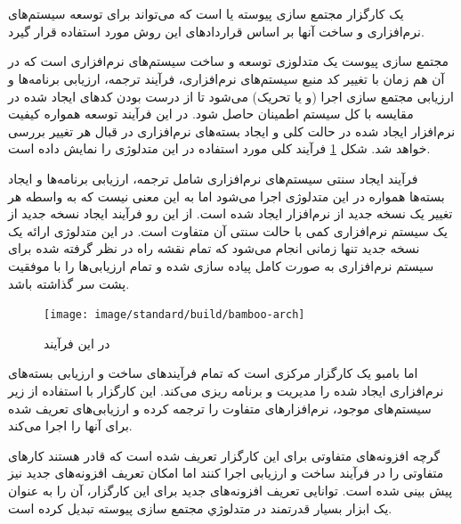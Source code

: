 
\section{}

 یک کارگزار مجتمع سازی پیوسته یا
 است که می‌تواند برای توسعه سیستم‌های نرم‌افزاری و ساخت آنها بر اساس
قراردادهای این روش مورد استفاده قرار گیرد.

مجتمع سازی پیوست یک متدلوزی توسعه و ساخت سیستم‌های نرم‌افزاری است که در آن 
هم زمان با تغییر کد منبع سیستم‌های نرم‌افزاری، فرآیند ترجمه، ارزیابی
برنامه‌ها و ارزیابی مجتمع سازی اجرا (و یا تحریک) می‌شود تا از درست بودن کدهای
ایجاد شده در مقایسه با کل سیستم اطمینان حاصل شود. در این فرآیند توسعه همواره
کیفیت نرم‌افزار ایجاد شده در حالت کلی و ایجاد بسته‌های نرم‌افزاری در قبال هر
تغییر بررسی خواهد شد. شکل \ref{image/standard/build/bamboo-arch} فرآیند کلی مورد
استفاده در این متدلوژی را نمایش داده است.

فرآیند ایجاد سنتی سیستم‌های نرم‌افزاری شامل ترجمه، ارزیابی برنامه‌ها و ایجاد
بسته‌ها همواره در این متدلوژی اجرا می‌شود اما به این معنی نیست که به واسطه هر
تغییر یک نسخه جدید از نرم‌افزار ایجاد شده است. از این رو فرآیند ایجاد نسخه جدید
از یک سیستم نرم‌افزاری کمی با حالت سنتی آن متفاوت است. در این متدلوژی ارائه یک
نسخه جدید تنها زمانی انجام می‌شود که تمام نقشه راه در نظر گرفته شده برای سیستم
نرم‌افزاری به صورت کامل پیاده سازی شده و تمام ارزیابی‌ها را با موفقیت پشت
سر گذاشته باشد.

\begin{figure}
\centering
\texttt{[image: image/standard/build/bamboo-arch]}
\caption[فرآیند مجتمع سازی پیوسته یا ]{
	در این فرآيند
}
\label{image/standard/build/bamboo-arch}
\end{figure}



اما بامبو یک کارگزار مرکزی است که تمام فرآیندهای ساخت و ارزیابی بسته‌های
نرم‌افزاری ایجاد شده را مدیریت و برنامه ریزی می‌کند. این کارگزار با استفاده از
زیر سیستم‌های موجود، نرم‌افزارهای متفاوت را ترجمه کرده و ارزیابی‌های تعریف شده
برای آنها را اجرا می‌کند.

گرچه افزونه‌های متفاوتی برای این کارگزار تعریف شده است که قادر هستند کارهای
متفاوتی را در فرآیند ساخت و ارزیابی اجرا کنند اما امکان تعریف افزونه‌های جدید
نیز پیش بینی شده است. توانایی تعریف افزونه‌های جدید برای این کارگزار، آن را به
عنوان یک ابزار بسیار قدرتمند در متدلوژي مجتمع سازی پیوسته تبدیل کرده است.

